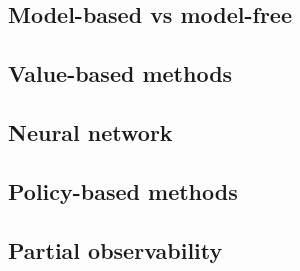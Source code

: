 \subsection{Model-based vs model-free} \label{ch2:sec:Model-based vs model-free}
\subsection{Value-based methods} \label{ch2:sec:Value-based methods}
\subsection{Neural network} \label{ch2:sec:Neural network}
\subsection{Policy-based methods} \label{ch2:sec:Policy-based methods}
\subsection{Partial observability} \label{ch2:sec:Partial observability}